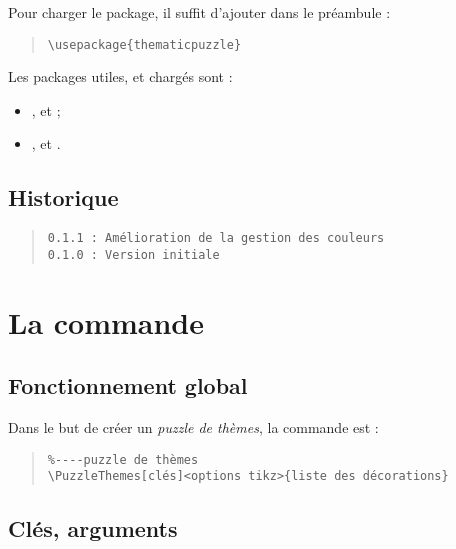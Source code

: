 \documentclass[11pt,a4paper]{ltxdoc}
\begin{document}
Pour charger le package, il suffit d'ajouter dans le préambule :

\begin{quote}
\begin{verbatim}
\usepackage{thematicpuzzle}
\end{verbatim}
\end{quote}

Les packages utiles, et chargés sont :

\begin{itemize}
	\item {},  et  ;
	\item {},  et .
\end{itemize}

\vfill

\subsection{Historique}

\begin{quote}
\begin{verbatim}
0.1.1 : Amélioration de la gestion des couleurs
0.1.0 : Version initiale
\end{verbatim}
\end{quote}

\pagebreak

\section{La commande}

\subsection{Fonctionnement global}

Dans le but de créer un \textit{puzzle de thèmes}, la commande est :

\begin{quote}
\begin{verbatim}
%----puzzle de thèmes
\PuzzleThemes[clés]<options tikz>{liste des décorations}
\end{verbatim}
\end{quote}

\subsection{Clés, arguments}
\end{document}
